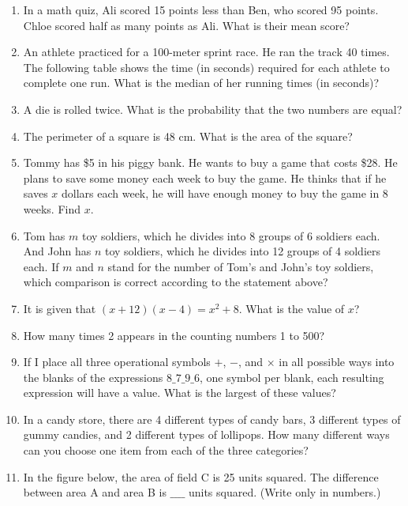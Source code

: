 \documentclass[11pt]{scrartcl}
\begin{document}
\begin{enumerate}
\item In a math quiz, Ali scored 15 points less than Ben, who scored 95 points. Chloe scored half as many points as Ali. What is their mean score?

\item An athlete practiced for a 100-meter sprint race. He ran the track 40 times. The following table shows the time (in seconds) required for each athlete to complete one run. What is the median of her running times (in seconds)?

\item A die is rolled twice. What is the probability that the two numbers are equal?

\item The perimeter of a square is 48 cm. What is the area of the square?

\item Tommy has \$5 in his piggy bank. He wants to buy a game that costs \$28. He plans to save some money each week to buy the game. He thinks that if he saves $x$ dollars each week, he will have enough money to buy the game in 8 weeks. Find $x$.

\item Tom has $m$ toy soldiers, which he divides into 8 groups of 6 soldiers each. And John has $n$ toy soldiers, which he divides into 12 groups of 4 soldiers each. If $m$ and $n$ stand for the number of Tom's and John's toy soldiers, which comparison is correct according to the statement above?

\item It is given that $(x+12)(x-4) = x^2 + 8$. What is the value of $x$?

\item How many times 2 appears in the counting numbers 1 to 500?

\item If I place all three operational symbols $+$, $-$, and $\times$ in all possible ways into the blanks of the expressions $8 \_ 7 \_ 9 \_ 6$, one symbol per blank, each resulting expression will have a value. What is the largest of these values?

\item In a candy store, there are 4 different types of candy bars, 3 different types of gummy candies, and 2 different types of lollipops. How many different ways can you choose one item from each of the three categories?

\item In the figure below, the area of field C is 25 units squared. The difference between area A and area B is $\_\_\_\_$ units squared. (Write only in numbers.)


\end{enumerate}
\end{document}
